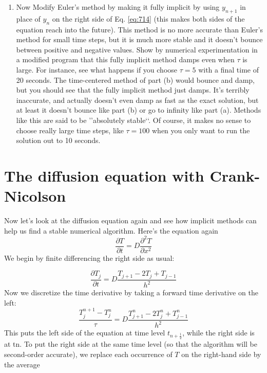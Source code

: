 \begin{problem}
\begin{enumerate}[label=(\alph*)]
\item  Now Modify Euler\rq s method by making it fully implicit by using $y_{n+1}$
in place of $y_n$ on the right side of Eq. \ref{eq:714} (this makes both sides of
the equation reach into the future). This method is no more accurate
than Euler\rq s method for small time steps, but it is much more stable
and it doesn\rq t bounce between positive and negative values.
Show by numerical experimentation in a modified program that this
fully implicit method damps even when $ \tau $ is large. For instance, see
what happens if you choose $ \tau = 5$ with a final time of 20 seconds. The
time-centered method of part (b) would bounce and damp, but you
should see that the fully implicit method just damps. It\rq s terribly inaccurate, and actually doesn\rq t even damp as fast as the exact solution,
but at least it doesn\rq t bounce like part (b) or go to infinity like part (a).
Methods like this are said to be \rq\rq absolutely stable\lq\lq. Of course, it makes
no sense to choose really large time steps, like $ \tau = 100$ when you only
want to run the solution out to 10 seconds.

\end{enumerate}
\end{problem}
\section*{The diffusion equation with Crank-Nicolson}
		
Now let\rq s look at the diffusion equation again and see how implicit methods can
help us find a stable numerical algorithm. Here\rq s the equation again
\begin{equation}\label{eq:715}
\frac{\partial T}{\partial t}=D \frac{\partial^{2} T}{\partial x^{2}}
\end{equation}
We begin by finite differencing the right side as usual:

\begin{equation}\label{eq:716}
\frac{\partial T_{j}}{\partial t}=D \frac{T_{j+1}-2 T_{j}+T_{j-1}}{h^{2}}
\end{equation}
Now we discretize the time derivative by taking a forward time derivative on the
left:
\begin{equation}\label{eq:717}
\frac{T_{j}^{n+1}-T_{j}^{n}}{\tau}=D \frac{T_{j+1}^{n}-2 T_{j}^{n}+T_{j-1}^{n}}{h^{2}}
\end{equation}
This puts the left side of the equation at time level $t_{n+\frac{1}{2}}$, while the right side is
at tn. To put the right side at the same time level (so that the algorithm will be
second-order accurate), we replace each occurrence of $T$ on the right-hand side
by the average

